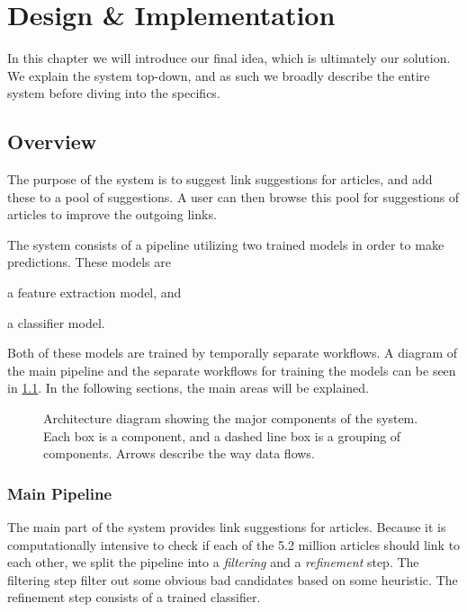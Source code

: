 \chapter{Design \& Implementation}\label{chap:design}
In this chapter we will introduce our final idea, which is ultimately our solution. We explain the system top-down, and as such we broadly describe the entire system before diving into the specifics.


\section{Overview}\label{sec:design_overview}
The purpose of the system is to suggest link suggestions for articles, and add these to a pool of suggestions. A user can then browse this pool for suggestions of articles to improve the outgoing links.

The system consists of a pipeline utilizing two trained models in order to make predictions. These models are
\begin{enumerate*}[label=(\roman*)]
  \item a feature extraction model, and
  \item a classifier model.
\end{enumerate*}
Both of these models are trained by temporally separate workflows. A diagram of the main pipeline and the separate workflows for training the models can be seen in \cref{fig:system-overview}. In the following sections, the main areas will be explained.

\begin{figure}[tb]%
  \centering
  
\caption[Architecture diagram showing the major components of the system]{Architecture diagram showing the major components of the system. Each box is a component, and a dashed line box is a grouping of components. Arrows describe the way data flows.}%
\label{fig:system-overview}%
\end{figure}



\subsection{Main Pipeline}
The main part of the system provides link suggestions for articles. Because it is computationally intensive to check if each of the 5.2 million articles should link to each other, we split the pipeline into a \emph{filtering} and a \emph{refinement} step. The filtering step filter out some obvious bad candidates based on some heuristic. The refinement step consists of a trained classifier.

